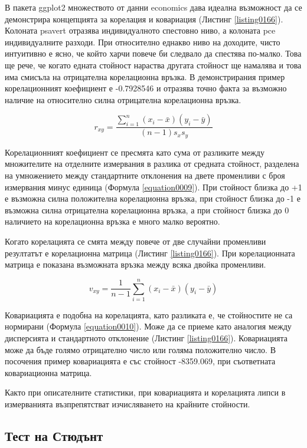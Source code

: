 В пакета ggplot2 множеството от данни economics дава идеална възможност да се демонстрира концепцията за корелация и ковариация (Листинг \ref{listing0166}). Колоната psavert отразява индивидуалното спестовно ниво, а колоната pce индивидуалните разходи. При относително еднакво ниво на доходите, чисто интуитивно е ясно, че който харчи повече би следвало да спестява по-малко. Това ще рече, че когато едната стойност нараства другата стойност ще намалява и това има смисъла на отрицателна корелационна връзка. В демонстрирания пример корелационният коефициент е -0.7928546 и отразява точно факта за възможно наличие на относително силна отрицателна корелационна връзка. 

\begin{equation}
r_{xy} = \frac{\sum_{i=1}^{n}(x_i-\bar{x})(y_i-\bar{y})}{(n-1)s_xs_y}
\label{equation0009}
\end{equation}

Корелационният коефициент се пресмята като сума от разликите между множителите на отделните измервания в разлика от средната стойност, разделена на умножението между стандартните отклонения на двете променливи с броя измервания минус единица (Формула \ref{equation0009}). При стойност близка до +1 е възможна силна положителна корелационна връзка, при стойност близка до -1 е възможна силна отрицателна корелационна връзка, а при стойност близка до 0 наличието на корелационна връзка е много малко вероятно. 

Когато корелацията се смята между повече от две случайни променливи резултатът е корелационна матрица (Листинг \ref{listing0166}). При корелационната матрица е показана възможната връзка между всяка двойка променливи. 

\begin{equation}
v_{xy} = \frac{1}{n-1}\sum_{i=1}^{n}(x_i-\bar{x})(y_i-\bar{y})
\label{equation0010}
\end{equation}

Ковариацията е подобна на корелацията, като разликата е, че стойностите не са нормирани (Формула \ref{equation0010}). Може да се приеме като аналогия между дисперсията и стандартното отклонение (Листинг \ref{listing0166}). Ковариацията може да бъде голямо отрицателно число или голяма положително число. В посочения пример ковариацията е със стойност -8359.069, при съответната ковариационна матрица. 

Както при описателните статистики, при ковариацията и корелацията липси в измерванията възпрепятстват изчисляването на крайните стойности. 

\subsection{Тест на Стюдънт}


